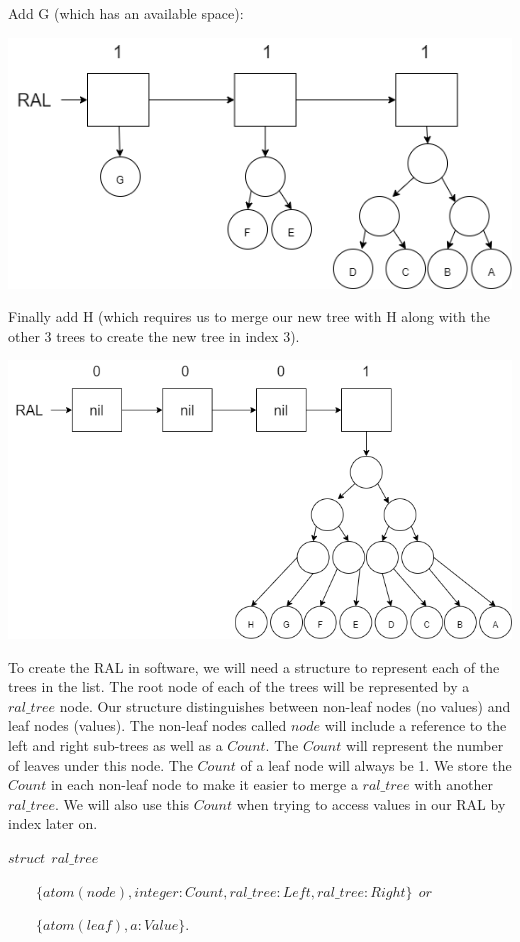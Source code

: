\documentclass[
]{book}
\begin{document}
Add G (which has an available space):

\includegraphics{images/ral7.drawio.png}

Finally add H (which requires us to merge our new tree with H along with the other 3 trees to create the new tree in index 3).

\includegraphics{images/ral8.drawio.png}

To create the RAL in software, we will need a structure to represent each of the trees in the list. The root node of each of the trees will be represented by a \(ral\_tree\) node. Our structure distinguishes between non-leaf nodes (no values) and leaf nodes (values). The non-leaf nodes called \(node\) will include a reference to the left and right sub-trees as well as a \(Count\). The \(Count\) will represent the number of leaves under this node. The \(Count\) of a leaf node will always be 1. We store the \(Count\) in each non-leaf node to make it easier to merge a \(ral\_tree\) with another \(ral\_tree\). We will also use this \(Count\) when trying to access values in our RAL by index later on.

\begin{formulabox}
\(struct ~ ~ ral\_tree\)

\(\quad \quad \lbrace atom(node), integer:Count, ral\_tree:Le\mathit{f}t, ral\_tree:Right \rbrace ~ ~ or\)

\(\quad \quad \lbrace atom(lea\mathit{f}), a:Value \rbrace.\)

\end{formulabox}
\end{document}
